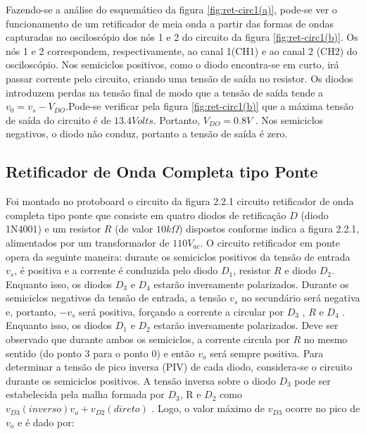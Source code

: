 \documentclass[a4paper]{article} %
\begin{document}
\newpage
          Fazendo-se a análise do esquemático da figura  \ref{fig:ret-circ1(a)}, pode-se ver o funcionamento de um retificador de meia onda a partir das formas de ondas capturadas no osciloscópio dos nós 1 e 2 do circuito da figura  \ref{fig:ret-circ1(b)}. Os nós 1 e 2 correspondem, respectivamente, ao canal 1(CH1) e ao canal 2 (CH2) do osciloscópio. Nos semiciclos positivos, como o diodo encontra-se em curto, irá passar corrente pelo circuito, criando uma tensão de saída no resistor. Os diodos introduzem perdas na tensão final de modo que a tensão de saída tende a $v_0=v_s-V_{DO}$.Pode-se verificar pela figura  \ref{fig:ret-circ1(b)} que a máxima tensão de saída do circuito é de   $13.4 Volts$. Portanto,    $V_{DO}= 0.8V $ . Nos semiciclos negativos, o diodo não conduz, portanto a tensão de saída é zero.
    


 \subsection{ Retificador de Onda Completa tipo Ponte}
         Foi montado no protoboard o circuito da figura 2.2.1 circuito retificador de onda completa tipo ponte que consiste em quatro diodos de retificação $D$ (diodo 1N4001) e um resistor $R$    (de valor $10k\Omega$) dispostos conforme indica a figura 2.2.1, alimentados por um transformador de $110V_{ac}$.
         O circuito retificador em ponte opera da seguinte maneira: durante os semiciclos positivos da tensão de entrada $v_s$, é positiva e a corrente é conduzida pelo diodo $D_1$, resistor $R$ e diodo $D_2$. Enquanto isso, os diodos  $D_3$      e $D_4$   estarão inversamente polarizados. Durante os semiciclos negativos da tensão de entrada, a tensão $v_s$ no secundário será negativa e, portanto,  $-v_s$     será positiva, forçando a corrente a circular por $D_3$ , $R$ e $D_4$ . Enquanto isso, os diodos $D_1$ e $D_2$   estarão inversamente polarizados.
         Deve ser observado que durante ambos os semiciclos, a corrente circula por $R$ no mesmo sentido (do ponto 3 para o ponto 0) e então   $v_o$    será sempre positiva.
         Para determinar a tensão de pico inversa (PIV) de cada diodo, considera-se o circuito durante os semiciclos positivos. A tensão inversa sobre o diodo $D_3$ pode ser estabelecida pela malha formada por $D_3$, R e $D_2$         como  $v_{D3}(inverso)v_o+v_{D2}(direto)$ . Logo, o valor máximo de $v_{D3}$     ocorre no pico de $v_o$    e é dado por:
                                    
\end{document}
